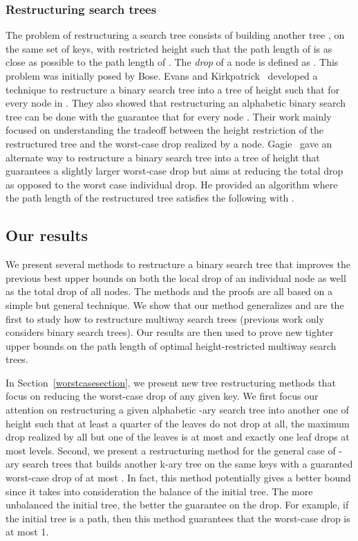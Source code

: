 \documentclass{llncs}\usepackage[english]{babel}
\begin{document}
\subsubsection*{Restructuring search trees}
The problem of restructuring a search tree  consists of building another tree , on the same set of keys, with restricted height such that the path length of  is as close as possible to the path length of . The \emph{drop} of a node  is defined as . This problem was initially posed by Bose. Evans and Kirkpatrick~\cite{restructuringordered} developed a technique to restructure a binary search tree  into a tree  of height  such that  for every node  in . They also showed that restructuring an alphabetic binary search tree can be done with the guarantee that  for every node . Their work mainly focused on understanding the tradeoff between the height restriction of the restructured tree and the worst-case drop realized by a node. Gagie~\cite{Gagie} gave an alternate way to restructure a binary search tree into a tree of height  that guarantees a slightly larger worst-case drop but aims at reducing the total drop as opposed to the worst case individual drop. He provided an algorithm where the path length of the restructured tree  satisfies the following  with . 


\subsection{Our results}
We present several methods to restructure a binary search tree that improves the previous best upper bounds on both the local drop of an individual node as well as the total drop of all nodes. The methods and the proofs are all based on a simple but general technique. We show that our method generalizes and are the first to study how to restructure multiway search trees (previous work only considers binary search trees).  Our results are then used to prove new tighter upper bounds on the path length of optimal height-restricted multiway search trees.

In Section~\ref{worstcasesection}, we present new tree restructuring methods that focus on reducing the worst-case drop of any given key. We first focus our attention on restructuring a given alphabetic -ary search tree into another one of height  such that at least a quarter of the leaves do not drop at all, the maximum drop realized by all but one of the leaves is at most  and
exactly one leaf drops at most  levels. Second, we present a restructuring method for the general case of -ary search trees that builds another k-ary tree on the same keys with a guaranted worst-case drop of at most . In fact, this method potentially gives a better bound since it takes into consideration the balance of the initial tree. The more unbalanced the initial tree, the better the guarantee on the drop. For example, if the initial tree is a path, then this method guarantees that the worst-case drop is at most 1.
\end{document}
